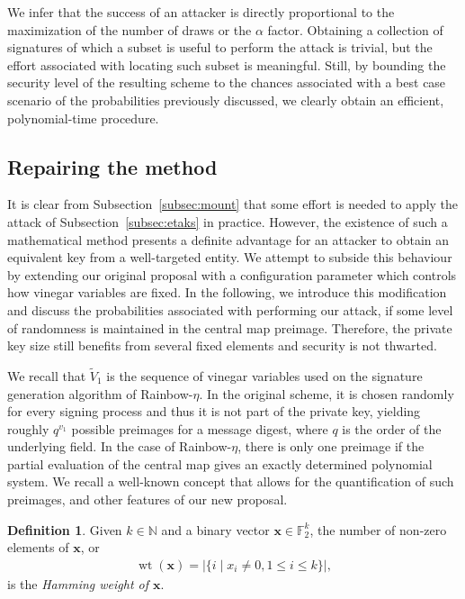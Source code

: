 \documentclass[12pt, a4paper, oneside]{memoir}
\DeclareMathOperator*{\wt}{wt}
\theoremstyle{definition}
\newtheorem{definition}[theorem]{Definition}
\begin{document}
We infer that the success of an attacker is directly proportional to the maximization of the number of draws or the $\alpha$ factor. Obtaining a collection of signatures of which a subset is useful to perform the attack is trivial, but the effort associated with locating such subset is meaningful. Still, by bounding the security level of the resulting scheme to the chances associated with a best case scenario of the probabilities previously discussed, we clearly obtain an efficient, polynomial-time procedure.

\subsection{Repairing the method}\label{subsec:repair}

It is clear from Subsection~\ref{subsec:mount} that some effort is needed to apply the attack of Subsection~\ref{subsec:etaks} in practice. However, the existence of such a mathematical method presents a definite advantage for an attacker to obtain an equivalent key from a well-targeted entity. We attempt to subside this behaviour by extending our original proposal with a configuration parameter which controls how vinegar variables are fixed. In the following, we introduce this modification and discuss the probabilities associated with performing our attack, if some level of randomness is maintained in the central map preimage. Therefore, the private key size still benefits from several fixed elements and security is not thwarted.

We recall that $\widetilde{V}_{1}$ is the sequence of vinegar variables used on the signature generation algorithm of Rainbow-$\eta$. In the original scheme, it is chosen randomly for every signing process and thus it is not part of the private key, yielding roughly $q^{v_{1}}$ possible preimages for a message digest, where $q$ is the order of the underlying field. In the case of Rainbow-$\eta$, there is only one preimage if the partial evaluation of the central map gives an exactly determined polynomial system. We recall a well-known concept that allows for the quantification of such preimages, and other features of our new proposal.

\begin{definition}
  Given $k \in \mathbb{N}$ and a binary vector $\mathbf{x} \in \mathbb{F}_{2}^{k}$, the number of non-zero elements of $\mathbf{x}$, or
  \begin{align}
    \wt(\mathbf{x}) = |\{ i \mid x_{i} \neq 0, 1 \leq i \leq k \}|,
  \end{align}
  is the \emph{Hamming weight of $\mathbf{x}$}.
\end{definition}
\end{document}
